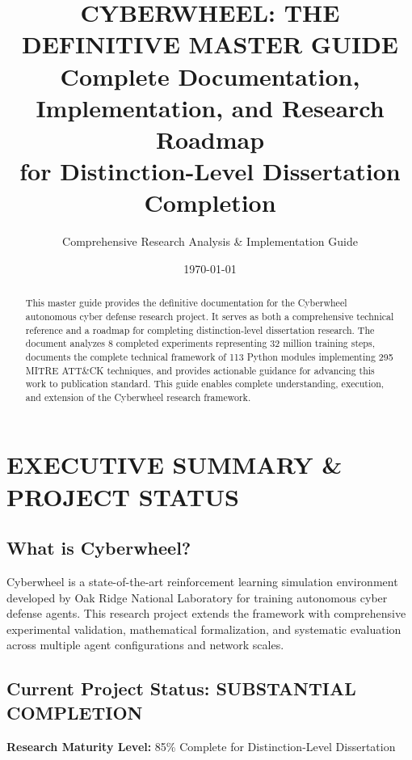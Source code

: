 \documentclass[11pt]{article}
\title{\textbf{CYBERWHEEL: THE DEFINITIVE MASTER GUIDE}\\
\large Complete Documentation, Implementation, and Research Roadmap\\
for Distinction-Level Dissertation Completion}
\author{Comprehensive Research Analysis \& Implementation Guide}
\date{\today}
\begin{document}
\maketitle

\begin{abstract}
This master guide provides the definitive documentation for the Cyberwheel autonomous cyber defense research project. It serves as both a comprehensive technical reference and a roadmap for completing distinction-level dissertation research. The document analyzes 8 completed experiments representing 32 million training steps, documents the complete technical framework of 113 Python modules implementing 295 MITRE ATT\&CK techniques, and provides actionable guidance for advancing this work to publication standard. This guide enables complete understanding, execution, and extension of the Cyberwheel research framework.
\end{abstract}

\tableofcontents
\newpage

\section{EXECUTIVE SUMMARY \& PROJECT STATUS}

\subsection{What is Cyberwheel?}

Cyberwheel is a state-of-the-art reinforcement learning simulation environment developed by Oak Ridge National Laboratory for training autonomous cyber defense agents. This research project extends the framework with comprehensive experimental validation, mathematical formalization, and systematic evaluation across multiple agent configurations and network scales.

\subsection{Current Project Status: SUBSTANTIAL COMPLETION}

\textbf{Research Maturity Level:} 85\% Complete for Distinction-Level Dissertation
\end{document}
